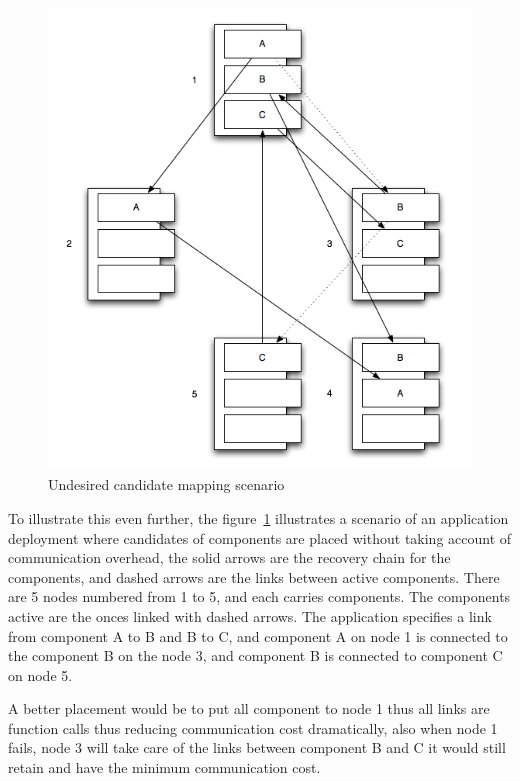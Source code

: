\begin{figure}[h!]
\caption{Undesired candidate mapping scenario}
\label{fig:sort-candidate-scenario}
\centering
    \includegraphics[width=\linewidth]{figures/sort-candidate-scenario}
\end{figure}

To illustrate this even further, the figure~\ref{fig:sort-candidate-scenario}
illustrates a scenario of an application deployment where candidates of
components are placed without taking account of communication overhead, the
solid arrows are the recovery chain for the components, and dashed arrows are
the links between active components. There are 5 nodes numbered from 1 to 5,
and each carries components. The components active are the onces linked
with dashed arrows. The application specifies a link from component A to
B and B to C, and component A on node 1 is connected to the component B on
the node 3, and component B is connected to component C on node 5.

A better placement would be to put all component to node 1 thus all links are
function calls thus reducing communication cost dramatically, also when node
1 fails, node 3 will take care of the links between component B and C it would
still retain and have the minimum communication cost.

